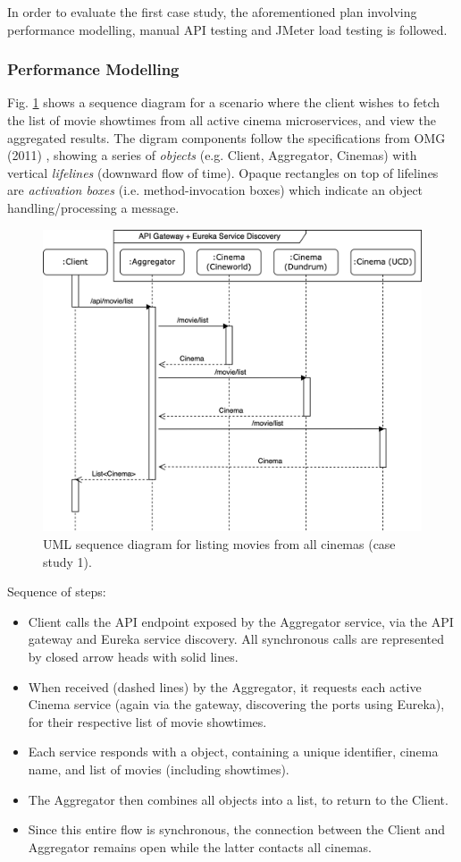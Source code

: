 In order to evaluate the first case study, the aforementioned plan involving performance modelling, manual API testing and JMeter load testing is followed.

\subsubsection{Performance Modelling}

Fig. \ref{fig:cs01-sequence} shows a sequence diagram for a scenario where the client wishes to fetch the list of movie showtimes from all active cinema microservices, and view the aggregated results. The digram components follow the specifications from OMG (2011) \cite{omg11}, showing a series of \textit{objects} (e.g. Client, Aggregator, Cinemas) with vertical \textit{lifelines} (downward flow of time). Opaque rectangles on top of lifelines are \textit{activation boxes} (i.e. method-invocation boxes) which indicate an object handling/processing a message.

\begin{figure}[H]
  \centering
  \includegraphics[width=0.75\linewidth]{./assets/diagrams/cs01-sequence.png}
  \caption{UML sequence diagram for listing movies from all cinemas (case study 1).}
  \label{fig:cs01-sequence}
\end{figure}

Sequence of steps:
\begin{itemize}
  \item Client calls the API endpoint  exposed by the Aggregator service, via the API gateway and Eureka service discovery. All synchronous calls are represented by closed arrow heads with solid lines.
  \item When received (dashed lines) by the Aggregator, it requests each active Cinema service (again via the gateway, discovering the ports using Eureka), for their respective list of movie showtimes.
  \item Each service responds with a  object, containing a unique identifier, cinema name, and list of movies (including showtimes).
  \item The Aggregator then combines all  objects into a list, to return to the Client.
  \item Since this entire flow is synchronous, the connection between the Client and Aggregator remains open while the latter contacts all cinemas.
\end{itemize}

